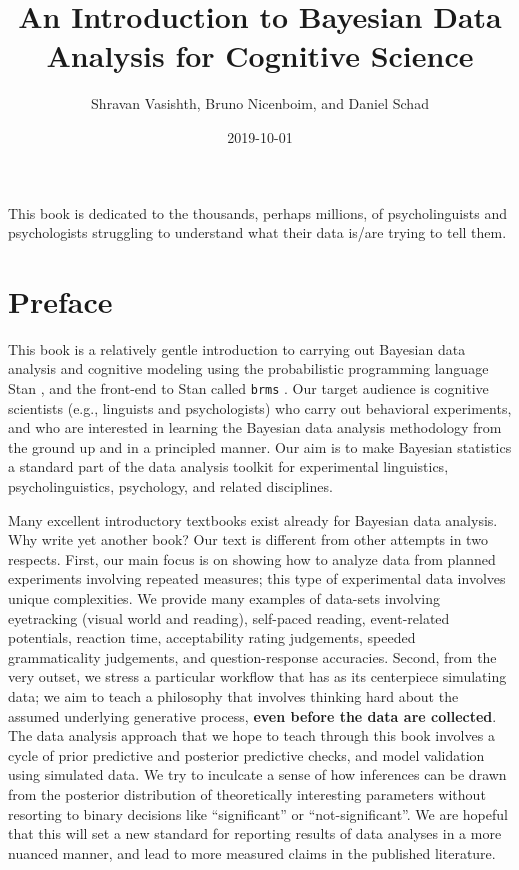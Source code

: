 \documentclass[12pt,]{krantz}
\title{An Introduction to Bayesian Data Analysis for Cognitive Science}
\author{Shravan Vasishth, Bruno Nicenboim, and Daniel Schad}
\date{2019-10-01}
\begin{document}
\maketitle

\thispagestyle{empty}
\begin{center}
This book is dedicated to the thousands, perhaps millions, of psycholinguists and psychologists struggling to understand what their data is/are trying to tell them.
\end{center}

\setlength{\abovedisplayskip}{-5pt}
\setlength{\abovedisplayshortskip}{-5pt}

{
\hypersetup{linkcolor=}
\setcounter{tocdepth}{2}
\tableofcontents
}
\listoftables
\listoffigures
\hypertarget{preface}{%
\chapter*{Preface}\label{preface}}


This book is a relatively gentle introduction to carrying out Bayesian data analysis and cognitive modeling using the probabilistic programming language Stan \citep{carpenter2017stan}, and the front-end to Stan called \texttt{brms} \citep{R-brms}. Our target audience is cognitive scientists (e.g., linguists and psychologists) who carry out behavioral experiments, and who are interested in learning the Bayesian data analysis methodology from the ground up and in a principled manner. Our aim is to make Bayesian statistics a standard part of the data analysis toolkit for experimental linguistics, psycholinguistics, psychology, and related disciplines.

Many excellent introductory textbooks exist already for Bayesian data analysis. Why write yet another book? Our text is different from other attempts in two respects. First, our main focus is on showing how to analyze data from planned experiments involving repeated measures; this type of experimental data involves unique complexities. We provide many examples of data-sets involving eyetracking (visual world and reading), self-paced reading, event-related potentials, reaction time, acceptability rating judgements, speeded grammaticality judgements, and question-response accuracies. Second, from the very outset, we stress a particular workflow that has as its centerpiece simulating data; we aim to teach a philosophy that involves thinking hard about the assumed underlying generative process, \textbf{even before the data are collected}. The data analysis approach that we hope to teach through this book involves a cycle of prior predictive and posterior predictive checks, and model validation using simulated data. We try to inculcate a sense of how inferences can be drawn from the posterior distribution of theoretically interesting parameters without resorting to binary decisions like ``significant'' or ``not-significant''. We are hopeful that this will set a new standard for reporting results of data analyses in a more nuanced manner, and lead to more measured claims in the published literature.
\end{document}
